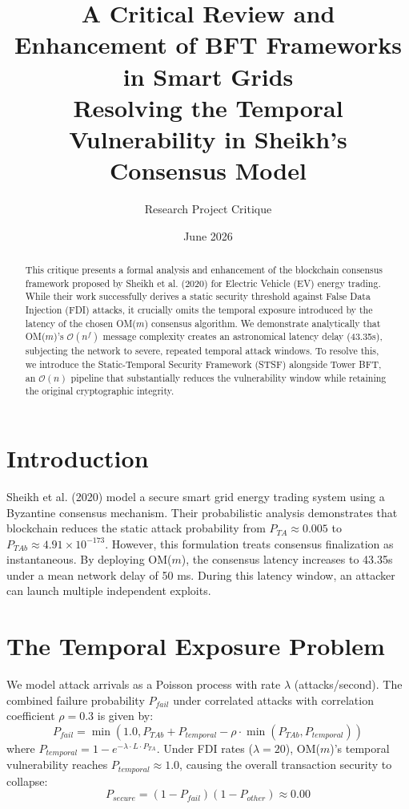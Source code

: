 \documentclass[10pt,twocolumn,letterpaper]{article}
\title{\textbf{A Critical Review and Enhancement of BFT Frameworks in Smart Grids}\\[6pt]
\large Resolving the Temporal Vulnerability in Sheikh's Consensus Model\\[4pt]}
\author{Research Project Critique}
\date{June 2026}
\begin{document}
\maketitle

\begin{abstract}
This critique presents a formal analysis and enhancement of the blockchain consensus framework proposed by Sheikh et al. (2020) for Electric Vehicle (EV) energy trading. While their work successfully derives a static security threshold against False Data Injection (FDI) attacks, it crucially omits the temporal exposure introduced by the latency of the chosen OM($m$) consensus algorithm. We demonstrate analytically that OM($m$)'s $\mathcal{O}(n^f)$ message complexity creates an astronomical latency delay (43.35s), subjecting the network to severe, repeated temporal attack windows. To resolve this, we introduce the Static-Temporal Security Framework (STSF) alongside Tower BFT, an $\mathcal{O}(n)$ pipeline that substantially reduces the vulnerability window while retaining the original cryptographic integrity.
\end{abstract}

\section{Introduction}
Sheikh et al. (2020) model a secure smart grid energy trading system using a Byzantine consensus mechanism. Their probabilistic analysis demonstrates that blockchain reduces the static attack probability from $P_{TA} \approx 0.005$ to $P_{TAb} \approx 4.91 \times 10^{-173}$. However, this formulation treats consensus finalization as instantaneous. By deploying OM($m$), the consensus latency increases to 43.35s under a mean network delay of 50 ms. During this latency window, an attacker can launch multiple independent exploits.

\section{The Temporal Exposure Problem}
We model attack arrivals as a Poisson process with rate $\lambda$ (attacks/second). The combined failure probability $P_{fail}$ under correlated attacks with correlation coefficient $\rho=0.3$ is given by:
\begin{equation}
P_{fail} = \min\left(1.0, P_{TAb} + P_{temporal} - \rho \cdot \min(P_{TAb}, P_{temporal})\right)
\end{equation}
where $P_{temporal} = 1 - e^{-\lambda \cdot L \cdot P_{TA}}$. Under FDI rates ($\lambda = 20$), OM($m$)'s temporal vulnerability reaches $P_{temporal} \approx 1.0$, causing the overall transaction security to collapse:
\begin{equation}
P_{secure} = (1 - P_{fail})(1 - P_{other}) \approx 0.00
\end{equation}
\end{document}
